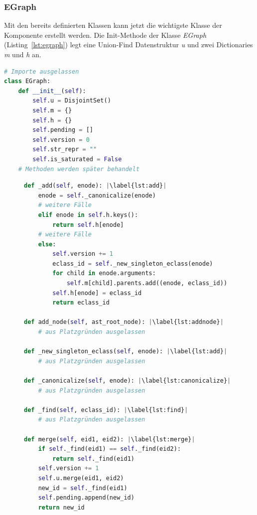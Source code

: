 \subsubsection{EGraph}

Mit den bereits definierten Klassen kann jetzt die wichtigste Klasse der Komponente erstellt werden. Die Init-Methode der Klasse \textit{EGraph} (Listing~\ref{lst:egraph})
legt eine Union-Find Datenstruktur \textit{u} und zwei Dictionaries \textit{m} und \textit{h} an.

\begin{lstlisting}[language=Python, caption=Auszug aus der Klasse \textit{EGraph}, label={lst:egraph}]
# Importe ausgelassen 
class EGraph:
    def __init__(self):
        self.u = DisjointSet()
        self.m = {}
        self.h = {}
        self.pending = []
        self.version = 0
        self.str_repr = ""
        self.is_saturated = False
    # Methoden werden später behandelt
\end{lstlisting} 


\begin{figure}
\vspace{-5mm}
\hspace{3mm}
\begin{minipage}[t]{\linewidth}
\begin{lstlisting}[language=Python, escapechar=|, caption=Auszug aus der Klasse \textit{EGraph}, label={lst:methods1}]
def _add(self, enode): |\label{lst:add}|
    enode = self._canonicalize(enode)
    # weitere Fälle 
    elif enode in self.h.keys():
        return self.h[enode]
    # weitere Fälle 
    else:
        self.version += 1
        eclass_id = self._new_singleton_eclass(enode)
        for child in enode.arguments:
            self.m[child].parents.add((enode, eclass_id))
        self.h[enode] = eclass_id
        return eclass_id

def add_node(self, ast_root_node): |\label{lst:addnode}|
    # aus Platzgründen ausgelassen

def _new_singleton_eclass(self, enode): |\label{lst:add}|
    # aus Platzgründen ausgelassen
    
def _canonicalize(self, enode): |\label{lst:canonicalize}|
    # aus Platzgründen ausgelassen

def _find(self, eclass_id): |\label{lst:find}|
    # aus Platzgründen ausgelassen

def merge(self, eid1, eid2): |\label{lst:merge}|
    if self._find(eid1) == self._find(eid2):
        return self._find(eid1)
    self.version += 1
    self.u.merge(eid1, eid2)
    new_id = self._find(eid1)
    self.pending.append(new_id)
    return new_id
\end{lstlisting} 
\end{minipage}
\end{figure}

